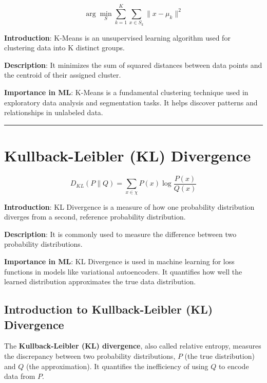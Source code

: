 \documentclass[
  12 pt,
  a4paper,
]{book}
\numberwithin{equation}{section}
\theoremstyle{plain}      %
\theoremstyle{definition} %
\theoremstyle{remark}     %
\theoremstyle{note}         %
\begin{document}
\[
\arg\min_S \sum_{k=1}^K \sum_{x \in S_k} \|x - \mu_k\|^2
\]

\textbf{Introduction}: K-Means is an unsupervised learning algorithm
used for clustering data into K distinct groups.

\textbf{Description}: It minimizes the sum of squared distances between
data points and the centroid of their assigned cluster.

\textbf{Importance in ML}: K-Means is a fundamental clustering technique
used in exploratory data analysis and segmentation tasks. It helps
discover patterns and relationships in unlabeled data.

\begin{center}\rule{0.5\linewidth}{0.5pt}\end{center}

\newpage

\hypertarget{kullback-leibler-kl-divergence}{%
\chapter{Kullback-Leibler (KL)
Divergence}\label{kullback-leibler-kl-divergence}}

\[
D_{KL}(P \| Q) = \sum_{x \in \chi} P(x) \log \frac{P(x)}{Q(x)}
\]

\textbf{Introduction}: KL Divergence is a measure of how one probability
distribution diverges from a second, reference probability distribution.

\textbf{Description}: It is commonly used to measure the difference
between two probability distributions.

\textbf{Importance in ML}: KL Divergence is used in machine learning for
loss functions in models like variational autoencoders. It quantifies
how well the learned distribution approximates the true data
distribution.

\newpage

\hypertarget{introduction-to-kullback-leibler-kl-divergence}{%
\section{Introduction to Kullback-Leibler (KL)
Divergence}\label{introduction-to-kullback-leibler-kl-divergence}}

The \textbf{Kullback-Leibler (KL) divergence}, also called relative
entropy, measures the discrepancy between two probability distributions,
\(P\) (the true distribution) and \(Q\) (the approximation). It
quantifies the inefficiency of using \(Q\) to encode data from \(P\).
\end{document}
